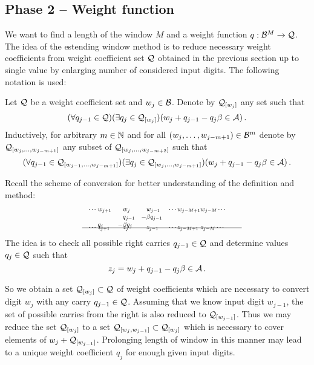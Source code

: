 \subsection{Phase 2 -- Weight function}
    We want to find a length of the window $M$ and a weight function $q:\mathcal{B}^{M} \to \mathcal{Q}$. The idea of the estending window method is to reduce necessary weight coefficients from weight coefficient set $\mathcal{Q}$ obtained in the previous section up to single value by enlarging number of considered input digits. The following notation is used: 
    \begin{defn}
        Let $\mathcal{Q}$ be a weight coefficient set and $w_j\in \mathcal{B}$. Denote by $\mathcal{Q}_{[w_j]}$ any set such that
        $$
            (\forall q_{j-1} \in \mathcal{Q})(\exists q_j \in \mathcal{Q}_{[w_j]})(w_j + q_{j-1} - q_j \beta \in \mathcal{A})\,.
        $$
        Inductively, for arbitrary $m \in \mathbb{N}$ and for all $(w_{j},\dots, w_{j-m+1})\in \mathcal{B}^{m}$ denote by $\mathcal{Q}_{[w_{j},\dots, w_{j-m+1}]}$ any subset of  $\mathcal{Q}_{[w_{j},\dots, w_{j-m+2}]}$ such that 
        $$
           (\forall q_{j-1} \in \mathcal{Q}_{[w_{j-1},\dots, w_{j-m+1}]})(\exists q_j \in \mathcal{Q}_{[w_{j},\dots, w_{j-m+1}]})(w_j + q_{j-1} - q_j \beta \in \mathcal{A})\,.
        $$
    \end{defn}
  
    Recall the scheme of conversion for better understanding of the definition and method:
    \begin{align*}
        \hspace{130pt}\cdots\; &w_{j+1}&\!\! &w_j  & \!\!  &w_{j-1}&\cdots w_{j-M+1} &w_{j-M}\cdots \hspace{130pt} \\[-3pt] 
                         & &       &q_{j-1}& -&\beta q_{j-1} \\[-3pt]
                           &q_j&   -&\beta q_j &&\\[-15pt]      
    \intertext{\hspace{120pt}\line(1,0){250}} 
          \vspace{-15pt}
          \\[-30pt]
     \cdots\; &z_{j+1}& &z_j& &z_{j-1}& \cdots z_{j-M+1}\; &z_{j-M}\cdots                     
    \end{align*}     
    The idea is to check all possible right carries $q_{j-1}\in\mathcal{Q}$ and determine values $q_j\in\mathcal{Q}$ such that 
    $$
    z_j=w_j + q_{j-1} - q_j \beta \in \mathcal{A} \,.
    $$  
    
    So we obtain a set $\mathcal{Q}_{[w_j]}\subset\mathcal{Q}$ of weight coefficients which are necessary to convert digit $w_j$ with any carry $q_{j-1}\in\mathcal{Q}$. Assuming that we know input digit $w_{j-1}$, the set of possible carries from the right is also reduced to $\mathcal{Q}_{[w_{j-1}]}$. Thus we may reduce the set $\mathcal{Q}_{[w_j]}$ to a set $\mathcal{Q}_{[w_j,w_{j-1}]}\subset \mathcal{Q}_{[w_j]}$ which is necessary to cover elements of $w_j + \mathcal{Q}_{[w_{j-1}]}$. Prolonging length of window in this manner may lead to a unique weight coefficient $q_j$ for enough given input digits.  
    
